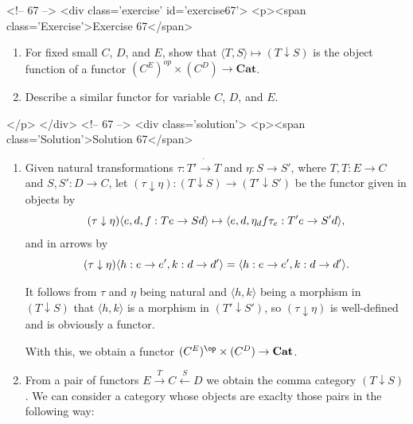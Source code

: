 <!-- 67 -->
<div class='exercise' id='exercise67'>
<p><span class='Exercise'>Exercise 67</span>
\begin{enumerate}
\item[(a)] For fixed small $C$, $D$, and $E$, show that $\langle T,S\rangle\mapsto(T\downarrow S)$ is the object function of a functor $(C^E)^{op}\times (C^D)\to\mathbf{Cat}$.
\item[(b)] Describe a similar functor for variable $C$, $D$, and $E$.
\end{enumerate}
</p>
</div>
<!-- 67 -->
<div class='solution'>
<p><span class='Solution'>Solution 67</span>
\begin{enumerate}
\item[(a)] Given natural transformations $\tau:T'\dot{\to}T$ and $\eta:S\to S'$, where $T,T:E\to C$ and $S,S':D\to C$, let $(\tau\downarrow\eta):(T\downarrow S)\to(T'\downarrow S')$ be the functor given in objects by
\vspace{-5pt}\[(\tau\downarrow\eta)\langle e,d,f:Te\to Sd\rangle\mapsto\langle e,d,\eta_d f\tau_e:T'e\to S'd\rangle,\vspace{-5pt}\]
and in arrows by
\vspace{-5pt}\[(\tau\downarrow\eta)\langle h:e\to e',k:d\to d'\rangle=\langle h:e\to e',k:d\to d'\rangle.\vspace{-5pt}\]

It follows from $\tau$ and $\eta$ being natural and $\langle h,k\rangle$ being a morphism in $(T\downarrow S)$ that $\langle h,k\rangle$ is a morphism in $(T'\downarrow S')$, so $(\tau\downarrow\eta)$ is well-defined and is obviously a functor.

With this, we obtain a functor $(C^E)^{\op}\times (C^D)\to\mathbf{Cat}$.
\item[(b)] From a pair of functors $E\overset{T}{\to}C\overset{S}{\leftarrow}D$ we obtain the comma category $(T\downarrow S)$. We can consider a category whose objects are exaclty those pairs in the following way:


\end{enumerate}
